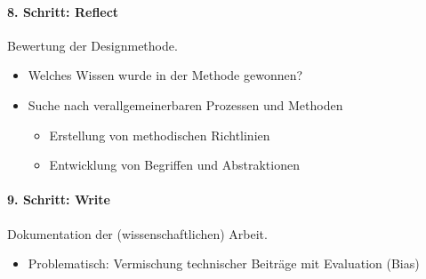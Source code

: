 			\paragraph{8. Schritt: Reflect}
			Bewertung der Designmethode.
			\begin{itemize}
				\item Welches Wissen wurde in der Methode gewonnen?
				\item Suche nach verallgemeinerbaren Prozessen und Methoden
					\begin{itemize}
						\item Erstellung von methodischen Richtlinien
						\item Entwicklung von Begriffen und Abstraktionen
					\end{itemize}
			\end{itemize}

			\paragraph{9. Schritt: Write}
			Dokumentation der (wissenschaftlichen) Arbeit.
			\begin{itemize}
				\item Problematisch: Vermischung technischer Beiträge mit Evaluation (Bias)
			\end{itemize}



























